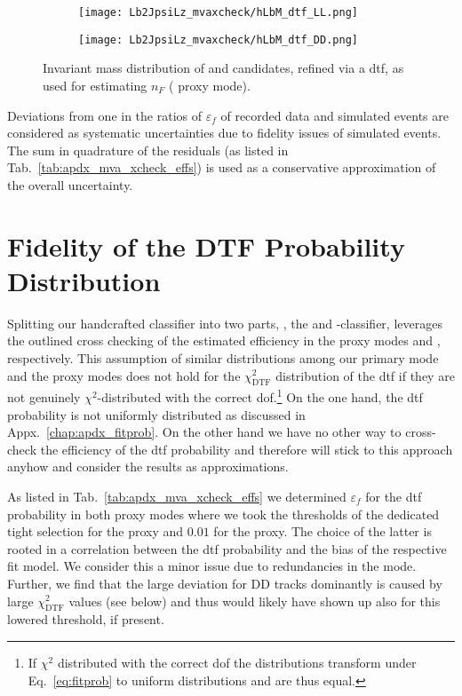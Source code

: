 \begin{figure}[htbp]
    \centering
    \begin{subfigure}{.49\textwidth}
        \centering
        \texttt{[image: Lb2JpsiLz\_mvaxcheck/hLbM\_dtf\_LL.png]}
    \end{subfigure}
    \begin{subfigure}{.49\textwidth}
        \centering
        \texttt{[image: Lb2JpsiLz\_mvaxcheck/hLbM\_dtf\_DD.png]}
    \end{subfigure}
    \caption{Invariant mass distribution of \jpsi and \Lz candidates, refined via a \gls{dtf}, as used for estimating $n_F$ (\decay{\Lb}{\jpsi\Lz} proxy mode).}
    \label{fig:LbToJpsiLz_mvaxcheck_hLbM_allcuts}
\end{figure}

Deviations from one in the ratios of $\varepsilon_f$ of recorded data and simulated events are considered as systematic uncertainties due to fidelity issues of simulated events.
The sum in quadrature of the residuals (as listed in Tab.~\ref{tab:apdx_mva_xcheck_effs}) is used as a conservative approximation of the overall uncertainty.

\section{Fidelity of the DTF Probability Distribution}
\label{sec:apdx_mva_xcheck_pdtf}
Splitting our handcrafted classifier into two parts, \ie{}, the \Lz and \Lb-\Dz classifier, leverages the outlined cross checking of the estimated efficiency in the proxy modes \decay{\Lb}{\jpsi\Lz} and \decay{\Lb}{\Dz\proton\pim}, respectively.
This assumption of similar distributions among our primary mode \decay{\Lb}{\Dz\Lz} and the proxy modes does not hold for the $\chi_\text{DTF}^2$ distribution of the \gls{dtf} if they are not genuinely $\chi^2$-distributed with the correct \gls{dof}.\footnote{If $\chi^2$ distributed with the correct \gls{dof} the distributions transform under Eq.~\eqref{eq:fitprob} to uniform distributions and are thus equal.}
On the one hand, the \gls{dtf} probability is not uniformly distributed as discussed in Appx.~\ref{chap:apdx_fitprob}.
On the other hand we have no other way to cross-check the efficiency of the \gls{dtf} probability and therefore will stick to this approach anyhow and consider the results as approximations.

As listed in Tab.~\ref{tab:apdx_mva_xcheck_effs} we determined $\varepsilon_f$ for the \gls{dtf} probability in both proxy modes where we took the thresholds of the dedicated \decay{\Lb}{\Dz\Lz} tight selection for the \decay{\Lb}{\jpsi\Lz} proxy and $0.01$ for the \decay{\Lb}{\Dz\proton\pim} proxy.
The choice of the latter is rooted in a correlation between the \gls{dtf} probability and the bias of the respective fit model.
We consider this a minor issue due to redundancies in the \decay{\Lb}{\jpsi\Lz} mode.
Further, we find that the large deviation for \gls{DD} tracks dominantly is caused by large $\chi_\text{DTF}^2$ values (see below) and thus would likely have shown up also for this lowered threshold, if present.

